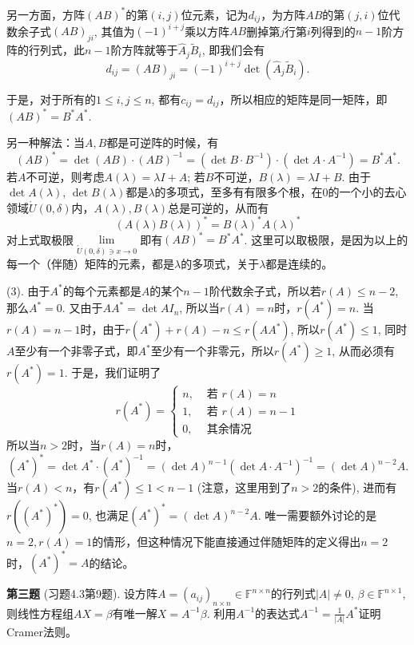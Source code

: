 另一方面，方阵$(AB)^*$的第$(i,j)$位元素，记为$d_{ij}$，为方阵$AB$的第$(j,i)$位代数余子式$(AB)_{ji}$, 其值为$(-1)^{i+j}$乘以方阵$AB$删掉第$j$行第$i$列得到的$n-1$阶方阵的行列式，此$n-1$阶方阵就等于$\widehat{A}_j \widetilde{B}_i$, 即我们会有
$$d_{ij} = (AB)_{ji} = (-1)^{i+j} \det(\widehat{A}_j \widetilde{B}_i).$$

于是，对于所有的$1\leqslant i,j \leqslant n$, 都有$c_{ij} = d_{ij}$，所以相应的矩阵是同一矩阵，即$(AB)^* = B^*A^*$.

另一种解法：当$A,B$都是可逆阵的时候，有
$$(AB)^* = \det(AB) \cdot (AB)^{-1} = (\det B \cdot B^{-1}) \cdot (\det A \cdot A^{-1}) = B^*A^*.$$
若$A$不可逆，则考虑$A(\lambda) = \lambda I + A$; 若$B$不可逆，$B(\lambda) = \lambda I + B$. 由于$\det A(\lambda)$, $\det B(\lambda)$都是$\lambda$的多项式，至多有有限多个根，在$0$的一个小的去心领域$\mathring{U}(0,\delta)$内，$A(\lambda), B(\lambda)$总是可逆的，从而有
$$(A(\lambda)B(\lambda))^* = B(\lambda)^*A(\lambda)^*$$
对上式取极限$\lim\limits_{\mathring{U}(0,\delta) \ni x\to 0}$即有$(AB)^* = B^*A^*$. 这里可以取极限，是因为以上的每一个（伴随）矩阵的元素，都是$\lambda$的多项式，关于$\lambda$都是连续的。

(3). 由于$A^*$的每个元素都是$A$的某个$n-1$阶代数余子式，所以若$r(A)\leqslant n-2$, 那么$A^* = 0$. 又由于$AA^* = \det A I_n$, 所以当$r(A) = n$时，$r(A^*) = n$. 当$r(A) = n-1$时，由于$r(A^*) + r(A) - n \leqslant r(AA^*)$, 所以$r(A^*) \leqslant 1$, 同时$A$至少有一个非零子式，即$A^*$至少有一个非零元，所以$r(A^*) \geqslant 1$, 从而必须有$r(A^*) = 1$. 于是，我们证明了
$$r(A^*) = \begin{cases} n, & \text{ 若 } r(A) = n \\ 1, & \text{ 若 } r(A) = n-1 \\ 0, & \text{ 其余情况} \end{cases}$$
所以当$n > 2$时，当$r(A) = n$时，
$$(A^*)^* = \det A^* \cdot (A^*)^{-1} = (\det A)^{n-1} (\det A \cdot A^{-1})^{-1} = (\det A)^{n-2} A.$$
当$r(A) < n$，有$r(A^*) \leqslant 1 < n-1$ (注意，这里用到了$n > 2$的条件), 进而有$r((A^*)^*) = 0$, 也满足$(A^*)^* = (\det A)^{n-2}A$. 唯一需要额外讨论的是$n=2, r(A) = 1$的情形，但这种情况下能直接通过伴随矩阵的定义得出$n = 2$时，$(A^*)^* = A$的结论。

\fi  %

\newpageorvspace

{\bf 第三题} (习题4.3第9题). 设方阵$A = (a_{ij})_{n\times n} \in \mathbb{F}^{n\times n}$的行列式$|A| \neq 0$, $\beta\in\mathbb{F}^{n\times 1}$, 则线性方程组$AX=\beta$有唯一解$X = A^{-1}\beta$. 利用$A^{-1}$的表达式$A^{-1} = \frac{1}{|A|}A^*$证明Cramer法则。

